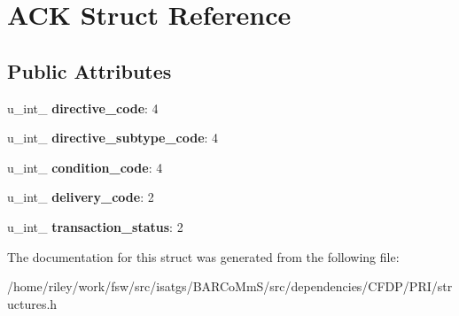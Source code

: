 \hypertarget{struct_a_c_k}{}\section{A\+CK Struct Reference}
\label{struct_a_c_k}
\subsection*{Public Attributes}
\begin{DoxyCompactItemize}
\item 
u\+\_\+int\+\_ {\bfseries directive\+\_\+code}\+: 4\hypertarget{struct_a_c_k_a9d1bc82f590c27eb334b3edaf0beaf25}{}\label{struct_a_c_k_a9d1bc82f590c27eb334b3edaf0beaf25}

\item 
u\+\_\+int\+\_ {\bfseries directive\+\_\+subtype\+\_\+code}\+: 4\hypertarget{struct_a_c_k_a5d377c03910335c534b288ae9d516cc0}{}\label{struct_a_c_k_a5d377c03910335c534b288ae9d516cc0}

\item 
u\+\_\+int\+\_ {\bfseries condition\+\_\+code}\+: 4\hypertarget{struct_a_c_k_a88a6885f40b72b90ff9016a9e69deb10}{}\label{struct_a_c_k_a88a6885f40b72b90ff9016a9e69deb10}

\item 
u\+\_\+int\+\_ {\bfseries delivery\+\_\+code}\+: 2\hypertarget{struct_a_c_k_ae4cfa1794f86a137a440b43558873a42}{}\label{struct_a_c_k_ae4cfa1794f86a137a440b43558873a42}

\item 
u\+\_\+int\+\_ {\bfseries transaction\+\_\+status}\+: 2\hypertarget{struct_a_c_k_a23f71d78a642ee940d522f1fba8d65c6}{}\label{struct_a_c_k_a23f71d78a642ee940d522f1fba8d65c6}

\end{DoxyCompactItemize}


The documentation for this struct was generated from the following file\+:\begin{DoxyCompactItemize}
\item 
/home/riley/work/fsw/src/isatgs/\+B\+A\+R\+Co\+Mm\+S/src/dependencies/\+C\+F\+D\+P/\+P\+R\+I/structures.\+h\end{DoxyCompactItemize}
